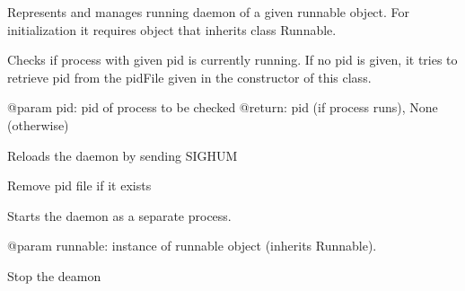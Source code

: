 \documentclass[a4paper,11pt,openany]{sphinxmanual}
\begin{document}
\begin{fulllineitems}
\label{ref-manual/XrdTest:XrdTest.Daemon.Daemon}
Represents and manages running daemon of a given runnable object.
For initialization it requires object that inherits class Runnable.

\begin{fulllineitems}
\label{ref-manual/XrdTest:XrdTest.Daemon.Daemon.check}
Checks if process with given pid is currently running. If no pid is
given, it tries to retrieve pid from the pidFile given in the
constructor of this class.

@param pid: pid of process to be checked
@return: pid (if process runs), None (otherwise)

\end{fulllineitems}


\begin{fulllineitems}
\label{ref-manual/XrdTest:XrdTest.Daemon.Daemon.reload}
Reloads the daemon by sending SIGHUM

\end{fulllineitems}


\begin{fulllineitems}
\label{ref-manual/XrdTest:XrdTest.Daemon.Daemon.removePidFile}
Remove pid file if it exists

\end{fulllineitems}


\begin{fulllineitems}
\label{ref-manual/XrdTest:XrdTest.Daemon.Daemon.start}
Starts the daemon as a separate process.

@param runnable: instance of runnable object (inherits Runnable).

\end{fulllineitems}


\begin{fulllineitems}
\label{ref-manual/XrdTest:XrdTest.Daemon.Daemon.stop}
Stop the deamon

\end{fulllineitems}


\end{fulllineitems}
\end{document}
